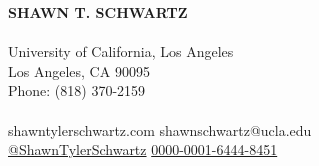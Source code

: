 \documentclass[margin]{res}
\begin{document}
	\thispagestyle{empty}
	{\LARGE\bf SHAWN T. SCHWARTZ} \\ \\
	University of California, Los Angeles \\
	Los Angeles, CA 90095 \\
	Phone: (818) 370-2159 \\ \\
	 shawntylerschwartz.com
	 shawnschwartz@ucla.edu \\
	 {\href{https://github.com/ShawnTylerSchwartz} {@ShawnTylerSchwartz}}
	\hspace{0.1cm}  {\href{https://orcid.org/0000-0001-6444-8451}{0000-0001-6444-8451}}
	\vspace{-0.5cm}
	
\end{document}
